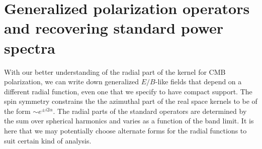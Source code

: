 \section{Generalized polarization operators and recovering standard power spectra}\label{sec:generalized_operators}  
With our better understanding of the radial part of the kernel for CMB polarization, we can write down generalized $E/B$-like fields that depend on a different radial function, even one that we specify to have compact support.
The spin symmetry constrains the the azimuthal part of the real space kernels to be of the form $\sim e^{\pm i2 \alpha}$.  The radial parts of the standard operators are determined by the sum over spherical harmonics and varies as a function of the band limit. It is here that we may potentially choose alternate forms for the radial functions to suit certain kind of analysis.

